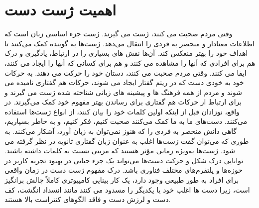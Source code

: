

\section{اهمیت ژست دست}
وقتی مردم صحبت می کنند، ژست می گیرند. ژست جزء اساسی زبان است که اطلاعات معنادار و منحصر به فردی را انتقال می‌دهد. ژست‌ها به گوینده کمک می‌کنند تا اهداف خود را بهتر منعکس کند. 
آن‌‌ها نقش های بسیاری را در ارتباط، یادگیری و درک هم برای افرادی که آنها را مشاهده می کنند و هم برای کسانی که آنها را ایجاد می کنند، ایفا می کنند.
وقتی مردم صحبت می کنند، دستان خود را حرکت می دهند. به حرکات خود به خودی دست که در ریتم گفتار ایجاد می شوند، حرکات هم گفتاری 
نامیده می شوند و مردم از همه فرهنگ ها و پیشینه های زبانی شناخته شده ژست می گیرند و برای ارتباط از حرکات هم گفتاری برای رساندن بهتر مفهوم خود کمک می‌گیرند.
در واقع، نوزادان قبل از اینکه اولین کلمات خود را بیان کنند، از انواع ژست‌ها استفاده می‌کنند. دست‌های ما به ما کمک می‌کنند صحبت کنیم، فکر کنیم، و به خاطر بسپاریم، گاهی دانش
منحصر به فردی را که هنوز نمی‌توان به زبان آورد، آشکار می‌کنند. به طوری که می‌توان گفت ژست‌ها اغلب به عنوان زبان گفتاری ثانویه در نظر گرفته می شود.\cite{clough2020role}
ژست‌ها به‌ویژه زمانی مؤثر هستند که مزیتی نسبت به کلمات داشته باشند. \cite{kang2016hands}
توانایی درک شکل و حرکت دست‌ها می‌تواند یک جزء حیاتی در بهبود تجربه کاربر  
در حوزه‌ها و پلتفرم‌های مختلف فناوری باشد. درک مفهوم ژست دست در زمان واقعی برای افراد به طور طبیعی وجود دارد، یک کار بینایی 
کامپیوتری کاملاً چالش برانگیز است، زیرا دست ها اغلب خود یا یکدیگر را مسدود می کنند مانند انسداد انگشت، کف دست و لرزش دست و فاقد الگوهای کنتراست بالا هستند.\cite{zhang2020mediapipe}

